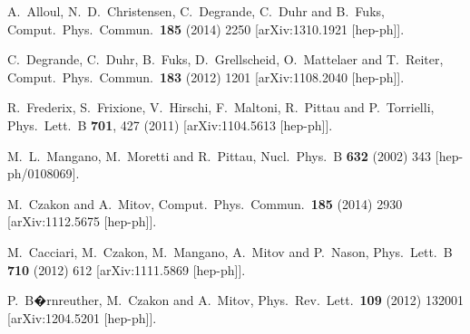 \documentclass[preprintnumbers,superscriptaddress,nofootinbib,aps,prd,floatfix]{revtex4}
\begin{document}
\begin{thebibliography}{99}
  A.~Alloul, N.~D.~Christensen, C.~Degrande, C.~Duhr and B.~Fuks,
  Comput.\ Phys.\ Commun.\  {\bf 185} (2014) 2250
  [arXiv:1310.1921 [hep-ph]].

  C.~Degrande, C.~Duhr, B.~Fuks, D.~Grellscheid, O.~Mattelaer and T.~Reiter,
  Comput.\ Phys.\ Commun.\  {\bf 183} (2012) 1201
  [arXiv:1108.2040 [hep-ph]].

  R.~Frederix, S.~Frixione, V.~Hirschi, F.~Maltoni, R.~Pittau and P.~Torrielli,
  Phys.\ Lett.\ B {\bf 701}, 427 (2011)
  [arXiv:1104.5613 [hep-ph]].

  M.~L.~Mangano, M.~Moretti and R.~Pittau,
  Nucl.\ Phys.\ B {\bf 632} (2002) 343
  [hep-ph/0108069].
  
  
  M.~Czakon and A.~Mitov,
  Comput.\ Phys.\ Commun.\  {\bf 185} (2014) 2930
  [arXiv:1112.5675 [hep-ph]].

  M.~Cacciari, M.~Czakon, M.~Mangano, A.~Mitov and P.~Nason,
  Phys.\ Lett.\ B {\bf 710} (2012) 612
  [arXiv:1111.5869 [hep-ph]].
  
  P.~B�rnreuther, M.~Czakon and A.~Mitov,
  Phys.\ Rev.\ Lett.\  {\bf 109} (2012) 132001
  [arXiv:1204.5201 [hep-ph]].



\end{thebibliography}
\end{document}
